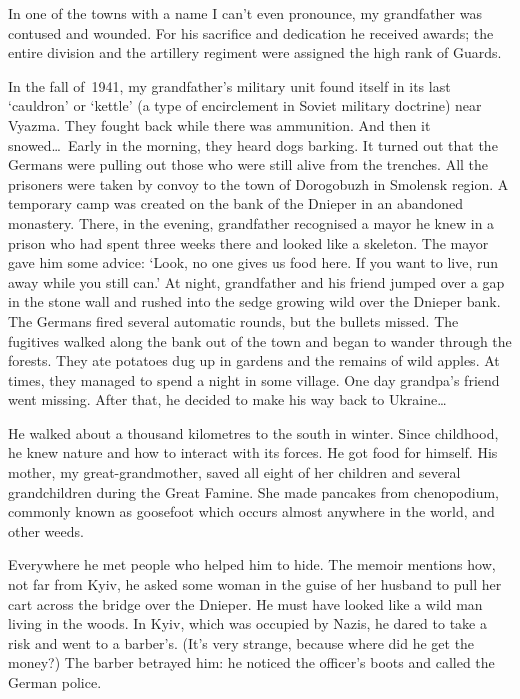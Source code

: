 In one of the towns with a name I can't even pronounce, my grandfather
was contused and wounded. For his sacrifice and dedication he received
awards; the entire division and the artillery regiment were assigned
the high rank of Guards.

In the fall of~1941, my grandfather's military unit found itself in
its last `cauldron' or `kettle' (a type of encirclement %
in Soviet military doctrine) near Vyazma. They fought back while there
was ammunition. And then it snowed\ldots\ Early in the morning, they
heard dogs barking. It turned out that the Germans were pulling out
those who were still alive from the trenches. All the prisoners were
taken by convoy to the town of Dorogobuzh in Smolensk region. A
temporary camp was created on the bank of the Dnieper in an abandoned
monastery. There, in the evening, grandfather recognised a mayor he
knew in a prison who had spent three weeks there and looked like a
skeleton. The mayor gave him some advice: `Look, no one gives us food
here. If you want to live, run away while you still can.' At night,
grandfather and his friend jumped over a gap in the stone wall and
rushed into the sedge growing wild over the Dnieper bank. The
Germans fired several automatic rounds, but the bullets missed. The
fugitives walked along the bank out of the town and began to wander
through the forests. They ate potatoes dug up in gardens and the
remains of wild apples. At times, they managed to spend a night in
some village. One day grandpa's friend went missing. After that, he
decided to make his way back to Ukraine\ldots

He walked about a thousand kilometres to the south in winter. Since
childhood, he knew nature and how to interact with its forces. He got
food for himself. His mother, my great-grandmother, saved all eight of
her children and several grandchildren during the Great Famine. She
made pancakes from chenopodium, commonly known as goosefoot which
occurs almost anywhere in the world, and other weeds.

Everywhere he met people who helped him to hide. The memoir mentions
how, not far from Kyiv, he asked some woman in the guise of her husband
to pull her cart across the bridge over the Dnieper. He must have
looked like a wild man living in the woods. In Kyiv, which was
occupied by Nazis, he dared to take a risk and went to a barber's.
(It's very strange, because where did he get the money?) The barber
betrayed him: he noticed the officer's boots and called the German
police.

